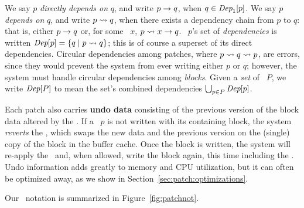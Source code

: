 We say $p$ \emph{directly depends on} $q$, and write $p \rightarrow q$, when
 $q \in \textit{Dep}_1[p]$.
%
We say $p$ \emph{depends on} $q$, and write $p \leadsto q$, when there
 exists a dependency chain from $p$ to $q$: that is, either $p \rightarrow q$
 or, for some \patch\ $x$, $p \leadsto x \rightarrow q$.
%
\Patch\ $p$'s set of \emph{dependencies} is written $\textit{Dep}[p] = \{ q \mid
 p \leadsto q \}$; this is of course a superset of its direct dependencies.
%
Circular dependencies among patches, where $p \leadsto q \leadsto p$, are
 errors, since they would prevent the system from ever writing either $p$
 or $q$; however, the system must handle circular dependencies among
 \emph{blocks}.
%
Given a \emph{set} of \patches\ $P$, we write $\textit{Dep}[P]$ to mean the set's
 combined dependencies $\bigcup_{p\in P} \textit{Dep}[p]$. 

\begin{comment}
\paragraph{Undo data}
%
When a \patch\ is created, the buffer cache's copy of the block data
is modified in-place to reflect the change. However,
%
some arrangements of \patches\ may require that the buffer cache
first write a block with only some \patches\ applied, and then write a
different block before being able to write the remaining \patches.
%
(An example of this is given in Section~\ref{sec:patch:examples}.)
\end{comment}

Each patch also carries \textbf{undo data} consisting of the 
 previous version of the block data altered by the \patch.
%
If a \patch\ $p$ is not written with its containing block, the system
 \emph{reverts} the \patch, which swaps the new data and the previous
 version on the (single) copy of the block in the buffer cache.
%
Once the block is written, the system will re-apply the \patch\ and, when
 allowed, write the block again, this time including the \patch.
%
Undo information adds greatly to memory and CPU utilization, but it can
 often be optimized away, as we show in Section~\ref{sec:patch:optimizations}.

Our \patch\ notation is summarized in Figure~\ref{fig:patchnot}.

